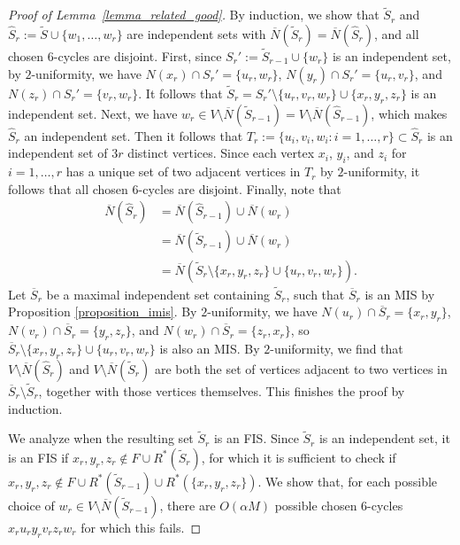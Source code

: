 \documentclass{article}
\theoremstyle{plain}
\theoremstyle{remark}
\theoremstyle{plain}
\numberwithin{equation}{section}
\begin{document}
\begin{proof}[Proof of Lemma~\ref{lemma_related_good}]
		By induction, we show that $\widetilde{S}_r$ and $\hat{S}_r:=\widetilde{S}\cup\{w_1,\ldots,w_r\}$ are independent sets with $\overline{N}(\widetilde{S}_r)=\overline{N}(\hat{S}_r)$, and all chosen $6$-cycles are disjoint. First, since $S_r':=\widetilde{S}_{r-1}\cup\{w_r\}$ is an independent set, by $2$-uniformity, we have $N(x_r)\cap S_r'=\{u_r,w_r\}$, $N(y_r)\cap S_r'=\{u_r,v_r\}$, and $N(z_r)\cap S_r'=\{v_r,w_r\}$. It follows that $\widetilde{S}_r=S_r'\setminus\{u_r,v_r,w_r\}\cup\{x_r,y_r,z_r\}$ is an independent set. Next, we have $w_r\in V\setminus\overline{N}(\widetilde{S}_{r-1})=V\setminus\overline{N}(\hat{S}_{r-1})$, which makes $\hat{S}_r$ an independent set. Then it follows that $T_r:=\{u_i,v_i,w_i:i=1,\ldots,r\}\subset\hat{S}_r$ is an independent set of $3r$ distinct vertices. Since each vertex $x_i$, $y_i$, and $z_i$ for $i=1,\ldots,r$ has a unique set of two adjacent vertices in $T_r$ by $2$-uniformity, it follows that all chosen $6$-cycles are disjoint. Finally, note that
		\begin{align}
			\overline{N}(\hat{S}_r)
			&=\overline{N}(\hat{S}_{r-1})\cup\overline{N}(w_r)
			\\&=\overline{N}(\widetilde{S}_{r-1})\cup\overline{N}(w_r)
			\\&=\overline{N}(\widetilde{S}_r\setminus\{x_r,y_r,z_r\}\cup\{u_r,v_r,w_r\}).
		\end{align}
		Let $\overline{S}_r$ be a maximal independent set containing $\widetilde{S}_r$, such that $\overline{S}_r$ is an MIS by Proposition \ref{proposition_imis}. By $2$-uniformity, we have $N(u_r)\cap\overline{S}_r=\{x_r,y_r\}$, $N(v_r)\cap\overline{S}_r=\{y_r,z_r\}$, and $N(w_r)\cap\overline{S}_r=\{z_r,x_r\}$, so $\overline{S}_r\setminus\{x_r,y_r,z_r\}\cup\{u_r,v_r,w_r\}$ is also an MIS. By $2$-uniformity, we find that $V\setminus\overline{N}(\hat{S}_r)$ and $V\setminus\overline{N}(\widetilde{S}_r)$ are both the set of vertices adjacent to two vertices in $\overline{S}_r\setminus\widetilde{S}_r$, together with those vertices themselves. This finishes the proof by induction.
		
		We analyze when the resulting set $\widetilde{S}_r$ is an FIS. Since $\widetilde{S}_r$ is an independent set, it is an FIS if $x_r,y_r,z_r\not\in F\cup R^*(\widetilde{S}_r)$, for which it is sufficient to check if $x_r,y_r,z_r\not\in F\cup R^*(\widetilde{S}_{r-1})\cup R^*(\{x_r,y_r,z_r\})$. We show that, for each possible choice of $w_r\in V\setminus\overline{N}(\widetilde{S}_{r-1})$, there are $O(\alpha M)$ possible chosen $6$-cycles $x_ru_ry_rv_rz_rw_r$ for which this fails.
		

\end{proof}
\end{document}
